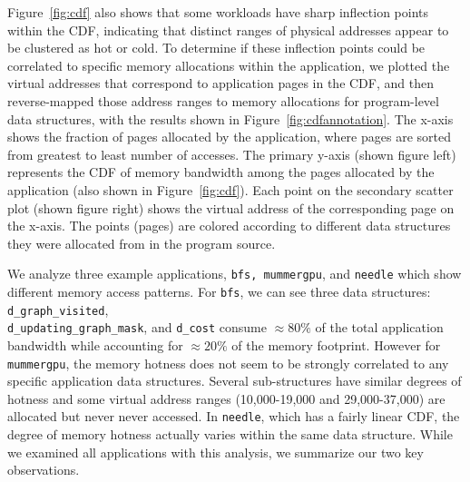 Figure~\ref{fig:cdf} also shows that some workloads have sharp inflection points
within the CDF, indicating that distinct 
ranges of physical addresses appear to be clustered as hot or cold. To determine if these inflection points 
could be correlated to specific memory allocations within the application, we plotted the virtual addresses 
that correspond to application pages in the CDF, and then reverse-mapped those
address ranges to memory allocations for program-level data structures, 
with the results shown in Figure~\ref{fig:cdfannotation}\@. 
{\color{black} The x-axis shows the fraction of pages allocated by the
application, where pages are sorted from greatest to least number of accesses.
The primary y-axis (shown figure left) represents the CDF of memory bandwidth
among the pages allocated by the application (also shown in Figure~\ref{fig:cdf}).
Each point on the secondary scatter plot (shown figure right) shows the virtual
address of the corresponding page on the x-axis. The points (pages) are colored
according to different data structures they were allocated from in the program source.}

{\color{black} We analyze three example applications, {\tt bfs,
mummergpu}, and {\tt needle}} which show different 
memory access patterns. For {\tt bfs},
we can see three data structures: {\tt d\_graph\_visited}, \\
{\tt d\_updating\_graph\_mask}, and {\tt d\_cost} consume {\color{black}$\approx80\%$ of the total application
bandwidth while accounting for $\approx20\%$} of the memory footprint. 
However for {\tt mummergpu}, the memory hotness does not seem to be strongly
correlated to any specific application data structures. Several sub-structures
have similar degrees of hotness and some virtual address ranges (10,000-19,000
and 29,000-37,000) are allocated but never never accessed. In {\tt needle}, which has a 
fairly linear CDF, the degree of memory hotness actually varies within the 
same data structure. While we examined all applications with this analysis, 
we summarize our two key observations.

